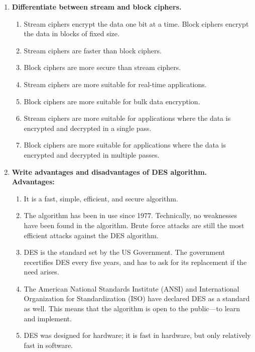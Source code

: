 \documentclass[openany]{book}
\begin{document}
\begin{enumerate}
	\item \textbf{Differentiate between stream and block ciphers.}\\
	      \begin{enumerate}
		      \item Stream ciphers encrypt the data one bit at a time. Block ciphers encrypt the data in blocks of fixed size.
		      \item Stream ciphers are faster than block ciphers.
		      \item Block ciphers are more secure than stream ciphers.
		      \item Stream ciphers are more suitable for real-time applications.
		      \item Block ciphers are more suitable for bulk data encryption.
		      \item Stream ciphers are more suitable for applications where the data is encrypted and decrypted in a single pass.
		      \item Block ciphers are more suitable for applications where the data is encrypted and decrypted in multiple passes.
	      \end{enumerate}

	\item \textbf{Write advantages and disadvantages of DES algorithm.}\\

	      \textbf{Advantages:}
	      \begin{enumerate}
		      \item It is a fast, simple, efficient, and secure algorithm.
		      \item The algorithm has been in use since 1977. Technically, no weaknesses have been found in the algorithm. Brute force attacks are still the most efficient attacks against the DES algorithm.
		      \item DES is the standard set by the US Government. The government recertifies DES every five years, and has to ask for its replacement if the need arises.
		      \item The American National Standards Institute (ANSI) and International Organization for Standardization (ISO) have declared DES as a standard as well. This means that the algorithm is open to the public—to learn and implement.
		      \item DES was designed for hardware; it is fast in hardware, but only relatively fast in software.
	      \end{enumerate}


\end{enumerate}
\end{document}
